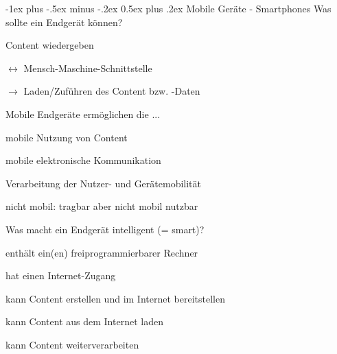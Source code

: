 \documentclass[a4paper]{article}
\makeatletter
\renewcommand{\section}{\@startsection{section}{1}{0mm}%
                                {-1ex plus -.5ex minus -.2ex}%
                                {0.5ex plus .2ex}%
                                {\normalfont\large\bfseries}}
\makeatother
\begin{document}
\begin{multicols*}{3}
  \setlength{\premulticols}{1pt}
  \setlength{\postmulticols}{1pt}
  \setlength{\multicolsep}{1pt}
  \setlength{\columnsep}{2pt}
  \raggedright

  \section{Mobile Geräte - Smartphones}
  Was sollte ein Endgerät können?
  \begin{itemize*}
    \item Content wiedergeben
    \item $\leftrightarrow$ Mensch-Maschine-Schnittstelle
    \item $\rightarrow$ Laden/Zuführen des Content bzw. -Daten
  \end{itemize*}

  \begin{itemize*}
    \item Mobile Endgeräte ermöglichen die ...
    \begin{itemize*}
      \item mobile Nutzung von Content
      \item mobile elektronische Kommunikation
      \item Verarbeitung der Nutzer- und Gerätemobilität
    \end{itemize*}
    \item nicht mobil: tragbar aber nicht mobil nutzbar
  \end{itemize*}

  Was macht ein Endgerät intelligent (= smart)?
  \begin{itemize*}
    \item enthält ein(en) freiprogrammierbarer Rechner
    \item hat einen Internet-Zugang
    \item kann Content erstellen und im Internet bereitstellen
    \item kann Content aus dem Internet laden
    \item kann Content weiterverarbeiten
  \end{itemize*}


\end{multicols*}
\end{document}
